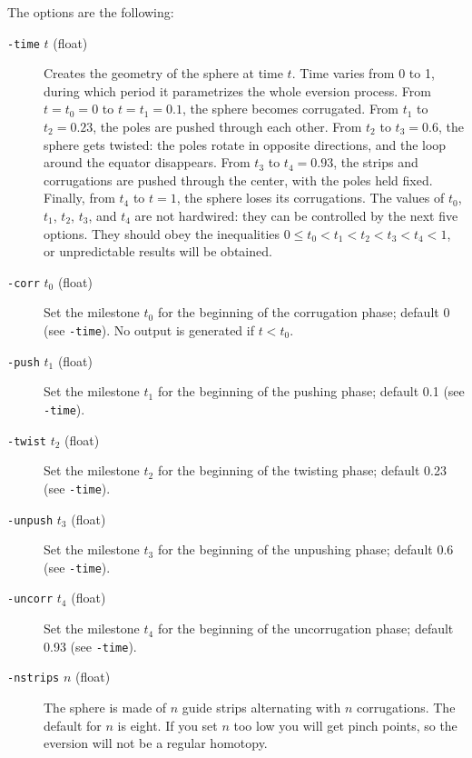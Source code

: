The options are the following:

\begin{description} 
\item[{\tt-time} $t$ (float)]
Creates the geometry of the sphere at time $t$.  Time varies from 0 to
1, during which period it parametrizes the whole eversion process.
From $t=t_0=0$ to $t=t_1=0.1$, the sphere becomes corrugated.  From
$t_1$ to $t_2=0.23$, the poles are pushed through each other.  From
$t_2$ to $t_3=0.6$, the sphere gets twisted: the poles rotate in
opposite directions, and the loop around the equator disappears.  From
$t_3$ to $t_4=0.93$, the strips and corrugations are pushed through
the center, with the poles held fixed.  Finally, from $t_4$ to $t=1$,
the sphere loses its corrugations.  The values of $t_0$, $t_1$, $t_2$,
$t_3$, and $t_4$ are not hardwired: they can be controlled by the next
five options.  They should obey the inequalities $0\le
t_0<t_1<t_2<t_3<t_4<1$, or unpredictable results will be obtained.

\item[{\tt-corr} $t_0$ (float)]
Set the milestone $t_0$ for the beginning of the corrugation phase;
default 0 (see {\tt-time}).  No output is generated if $t<t_0$.

\item[{\tt-push} $t_1$ (float)]
Set the milestone $t_1$ for the beginning of the pushing phase;
default 0.1 (see {\tt-time}).  

\item[{\tt-twist} $t_2$ (float)]
Set the milestone $t_2$ for the beginning of the twisting phase;
default 0.23 (see {\tt-time}).  

\item[{\tt-unpush} $t_3$ (float)]
Set the milestone $t_3$ for the beginning of the unpushing phase;
default 0.6 (see {\tt-time}).  

\item[{\tt-uncorr} $t_4$ (float)]
Set the milestone $t_4$ for the beginning of the uncorrugation phase;
default 0.93 (see {\tt-time}).  

\item[{\tt-nstrips} $n$ (float)]
The sphere is made of $n$ guide strips alternating with $n$
corrugations.  The default for $n$ is eight.  If you set $n$ too
low you will get pinch points, so the eversion will not be a regular
homotopy.


\end{description}
